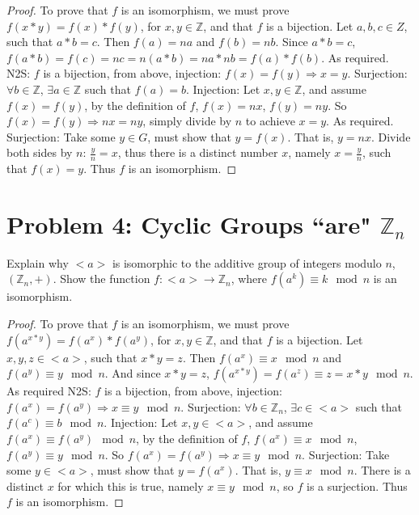 \documentclass[12pt]{article}
\newcommand{\Z}{\mathbb{Z}}
\begin{document}
\begin{enumerate}
\begin{proof}
    To prove that $f$ is an isomorphism, we must prove $f(x*y)=f(x)*f(y)$, for $x,y\in\Z$, and that $f$ is a bijection. \newline Let $a,b,c\in Z$, such that $a*b=c$. Then $f(a)=na$ and $f(b)=nb$. Since $a*b=c$, $f(a*b)=f(c)=nc=n(a*b)=na*nb=f(a)*f(b)$. As required.
    \newline N2S: $f$ is a bijection, from above, injection: $f(x)=f(y)\Longrightarrow x=y$. Surjection: $\forall b\in\Z$, $\exists a\in\Z$ such that $f(a)=b$.
    \newline Injection: Let $x,y\in\Z$, and assume $f(x)=f(y)$, by the definition of $f$, $f(x)=nx$, $f(y)=ny$. So $f(x)=f(y)\Longrightarrow nx=ny$, simply divide by $n$ to achieve $x=y$. As required.
    \newline Surjection: Take some $y\in G$, must show that $y=f(x)$. That is, $y=nx$. Divide both sides by $n$: $\frac{y}{n}=x$, thus there is a distinct number $x$, namely $x=\frac{y}{n}$, such that $f(x)=y$.
    \newline Thus $f$ is an isomorphism.
    \end{proof}
\end{enumerate}
\section{Problem 4: Cyclic Groups ``are" $\Z_n$}
Explain why $<a>$ is isomorphic to the additive group of integers modulo $n$, $(\Z_n,+)$. Show the function $f: <a>\longrightarrow \Z_n$, where $f(a^k)\equiv k \mod n$ is an isomorphism.
\begin{proof} To prove that $f$ is an isomorphism, we must prove $f(a^{x*y})=f(a^x)*f(a^y)$, for $x,y\in\Z$, and that $f$ is a bijection.
\newline Let $x,y,z\in <a>$, such that $x*y=z$. Then $f(a^x)\equiv x\mod n$ and $f(a^y)\equiv y\mod n$. And since $x*y=z$, $f(a^{x*y})=f(a^z)\equiv z=x*y \mod n$. As required
\newline N2S: $f$ is a bijection, from above, injection: $f(a^x)=f(a^y)\Longrightarrow x\equiv y\mod n$. Surjection: $\forall b\in\Z_n$, $\exists c\in <a>$ such that $f(a^c)\equiv b\mod n$.
\newline Injection: Let $x,y\in <a>$, and assume $f(a^x)\equiv f(a^y)\mod n$, by the definition of $f$, $f(a^x)\equiv x\mod n$, $f(a^y)\equiv y\mod n$. So $f(a^x)=f(a^y)\Longrightarrow x\equiv y\mod n$.
\newline Surjection: Take some $y\in <a>$, must show that $y=f(a^x)$. That is, $y\equiv x\mod n$. There is a distinct $x$ for which this is true, namely $x\equiv y\mod n$, so $f$ is a surjection.
\newline Thus $f$ is an isomorphism.
\end{proof}
\end{document}
